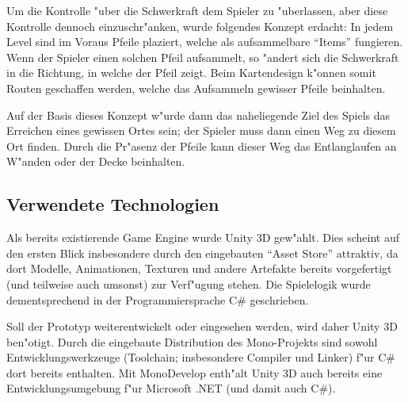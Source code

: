 Um die Kontrolle "uber die Schwerkraft dem Spieler zu "uberlassen, aber diese
Kontrolle dennoch einzuschr"anken, wurde folgendes Konzept erdacht: In jedem
Level sind im Voraus Pfeile plaziert, welche als aufsammelbare ``Items''
fungieren. Wenn der Spieler einen solchen Pfeil aufsammelt, so "andert sich
die Schwerkraft in die Richtung, in welche der Pfeil zeigt. Beim Kartendesign
k"onnen somit Routen geschaffen werden, welche das Aufsammeln gewisser Pfeile
beinhalten.

Auf der Basis dieses Konzept w"urde dann das naheliegende Ziel des Spiels das
Erreichen eines gewissen Ortes sein; der Spieler muss dann einen Weg zu diesem Ort
finden. Durch die Pr"asenz der Pfeile kann dieser Weg das Entlanglaufen an
W"anden oder der Decke beinhalten.
%
\subsection{Verwendete Technologien}
\label{sec:intro/technologies}
Als bereits existierende Game Engine wurde Unity 3D gew"ahlt. Dies scheint auf
den ersten Blick insbesondere durch den eingebauten ``Asset Store'' attraktiv,
da dort Modelle, Animationen, Texturen und andere Artefakte bereits vorgefertigt
(und teilweise auch umsonst) zur Verf"ugung stehen. Die Spielelogik wurde
dementsprechend in der Programmiersprache C\# geschrieben.

Soll der Prototyp weiterentwickelt oder eingesehen werden, wird daher Unity 3D
ben"otigt. Durch die eingebaute Distribution des Mono-Projekts sind sowohl
Entwicklungswerkzeuge (Toolchain; insbesondere Compiler und Linker) f"ur C\#
dort bereits enthalten. Mit MonoDevelop enth"alt Unity 3D auch bereits eine
Entwicklungsumgebung f"ur Microsoft .NET (und damit auch C\#).
